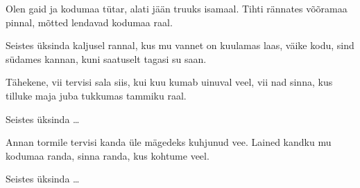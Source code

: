 Olen gaid ja kodumaa t\"utar,
alati j\"a\"an truuks isamaal.
Tihti r\"annates v\~o\~oramaa pinnal,
m\~otted lendavad kodumaa raal.

Seistes \"uksinda kaljusel rannal,
kus mu vannet on kuulamas laas,
v\"aike kodu, sind s\"udames kannan,
kuni saatuselt tagasi su saan.

T\"ahekene, vii tervisi sala
siis, kui kuu kumab uinuval veel,
vii nad sinna, kus tilluke maja
juba tukkumas tammiku raal.

Seistes \"uksinda \ldots

Annan tormile tervisi kanda
\"ule m\"agedeks kuhjunud vee.
Lained kandku mu kodumaa randa,
sinna randa, kus kohtume veel.

Seistes \"uksinda \ldots